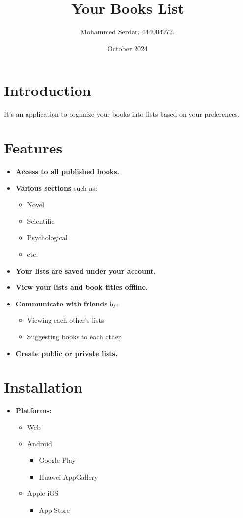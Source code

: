 \documentclass{article}
\begin{document}
\title{Your Books List}
\author{Mohammed Serdar. 444004972.}
\date{October 2024}
\maketitle

\section*{Introduction}
It's an application to organize your books into lists based on your preferences.

\section*{Features}
\begin{itemize}
    \item \textbf{Access to all published books.}
    \item \textbf{Various sections} such as:
    \begin{itemize}
        \item Novel
        \item Scientific
        \item Psychological
        \item etc.
    \end{itemize}
    \item \textbf{Your lists are saved under your account.}
    \item \textbf{View your lists and book titles offline.}
    \item \textbf{Communicate with friends} by:
    \begin{itemize}
        \item Viewing each other's lists
        \item Suggesting books to each other
    \end{itemize}
    \item \textbf{Create public or private lists.}
\end{itemize}

\section*{Installation}
\begin{itemize}
    \item \textbf{Platforms:}
    \begin{itemize}
        \item Web
        \item Android
        \begin{itemize}
            \item Google Play
            \item Huawei AppGallery
        \end{itemize}
        \item Apple iOS
        \begin{itemize}
            \item App Store
        \end{itemize}
    \end{itemize}
\end{itemize}
\end{document}
